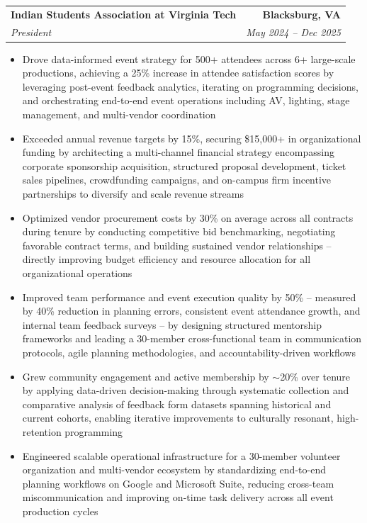 \documentclass[letterpaper,11pt]{article}
\makeatletter
\newcommand{\resumeItem}[1]{
  \item\small{{#1 \vspace{-2pt}}}
}
\newcommand{\resumeSubheadingTwo}[4]{ %
  \vspace{-2pt}\item
    \begin{tabular*}{1.0\textwidth}[t]{l@{\extracolsep{\fill}}r}
      \textbf{#3} & \textbf{\small #4} \\
      \textit{\small#1} & \textit{\small #2} \\
    \end{tabular*}\vspace{-7pt}
}
\newcommand{\resumeSubSubheading}[2]{
  \vspace{-2pt}\item
    \begin{tabular*}{1.0\textwidth}[t]{l@{\extracolsep{\fill}}r}
      \textit{\small#1} & \textit{\small #2} \\
    \end{tabular*}\vspace{-7pt}
}
\newcommand{\resumeItemListStart}{\begin{itemize}}
\newcommand{\resumeItemListEnd}{\end{itemize}\vspace{-5pt}}
\makeatother
\begin{document}
        \resumeSubheadingTwo
            {President}
            {May 2024 -- Dec 2025}
            {Indian Students Association at Virginia Tech}
            {Blacksburg, VA}
            \resumeItemListStart
                \resumeItem{Drove data-informed event strategy for 500+ attendees across 6+ large-scale productions, achieving a 25\% increase in attendee satisfaction scores by leveraging post-event feedback analytics, iterating on programming decisions, and orchestrating end-to-end event operations including AV, lighting, stage management, and multi-vendor coordination}
                \resumeItem{Exceeded annual revenue targets by 15\%, securing \$15,000+ in organizational funding by architecting a multi-channel financial strategy encompassing corporate sponsorship acquisition, structured proposal development, ticket sales pipelines, crowdfunding campaigns, and on-campus firm incentive partnerships to diversify and scale revenue streams}
                \resumeItem{Optimized vendor procurement costs by 30\% on average across all contracts during tenure by conducting competitive bid benchmarking, negotiating favorable contract terms, and building sustained vendor relationships -- directly improving budget efficiency and resource allocation for all organizational operations}
                \resumeItem{Improved team performance and event execution quality by 50\% -- measured by 40\% reduction in planning errors, consistent event attendance growth, and internal team feedback surveys -- by designing structured mentorship frameworks and leading a 30-member cross-functional team in communication protocols, agile planning methodologies, and accountability-driven workflows}
                \resumeItem{Grew community engagement and active membership by $\sim$20\% over tenure by applying data-driven decision-making through systematic collection and comparative analysis of feedback form datasets spanning historical and current cohorts, enabling iterative improvements to culturally resonant, high-retention programming}
                \resumeItem{Engineered scalable operational infrastructure for a 30-member volunteer organization and multi-vendor ecosystem by standardizing end-to-end planning workflows on Google and Microsoft Suite, reducing cross-team miscommunication and improving on-time task delivery across all event production cycles}
            \resumeItemListEnd
        
\end{document}
